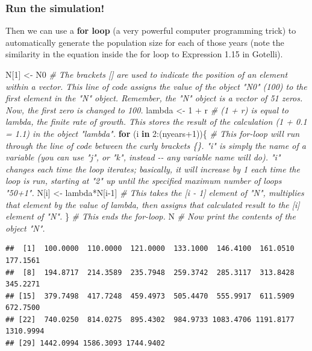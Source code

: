 \documentclass[
]{article}
\newenvironment{Shaded}{\begin{snugshade}}{\end{snugshade}}
\newcommand{\CommentTok}[1]{\textcolor[rgb]{0.56,0.35,0.01}{\textit{#1}}}
\newcommand{\ControlFlowTok}[1]{\textcolor[rgb]{0.13,0.29,0.53}{\textbf{#1}}}
\newcommand{\DecValTok}[1]{\textcolor[rgb]{0.00,0.00,0.81}{#1}}
\newcommand{\NormalTok}[1]{#1}
\newcommand{\OtherTok}[1]{\textcolor[rgb]{0.56,0.35,0.01}{#1}}
\newcommand{\SpecialCharTok}[1]{\textcolor[rgb]{0.00,0.00,0.00}{#1}}
\begin{document}
\hypertarget{run-the-simulation}{%
\subsubsection{Run the simulation!}\label{run-the-simulation}}

Then we can use a \textbf{for loop} (a very powerful computer
programming trick) to automatically generate the population size for
each of those years (note the similarity in the equation inside the for
loop to Expression 1.15 in Gotelli).

\begin{Shaded}
\begin{Highlighting}[]
\NormalTok{N[}\DecValTok{1}\NormalTok{] }\OtherTok{\textless{}{-}}\NormalTok{ N0                }\CommentTok{\# The brackets [] are used to indicate the position of an element within a vector. This line of code assigns the value of the object "N0" (100) to the first element in the "N" object. Remember, the "N" object is a vector of 51 zeros. Now, the first zero is changed to 100.}
\NormalTok{lambda }\OtherTok{\textless{}{-}} \DecValTok{1} \SpecialCharTok{+}\NormalTok{ r           }\CommentTok{\# (1 + r) is equal to lambda, the finite rate of growth.  This stores the result of the calculation (1 + 0.1 = 1.1) in the object "lambda".}
\ControlFlowTok{for}\NormalTok{ (i }\ControlFlowTok{in} \DecValTok{2}\SpecialCharTok{:}\NormalTok{(nyears}\SpecialCharTok{+}\DecValTok{1}\NormalTok{))\{  }\CommentTok{\# This for{-}loop will run through the line of code between the curly brackets \{\}. "i" is simply the name of a variable (you can use "j", or "k", instead {-}{-} any variable name will do). "i" changes each time the loop iterates; basically, it will increase by 1 each time the loop is run, starting at "2" up until the specified maximum number of loops "50+1". }
\NormalTok{  N[i] }\OtherTok{\textless{}{-}}\NormalTok{ lambda}\SpecialCharTok{*}\NormalTok{N[i}\DecValTok{{-}1}\NormalTok{]   }\CommentTok{\# This takes the [i {-} 1] element of "N", multiplies that element by the value of lambda, then assigns that calculated result to the [i] element of "N".}
\NormalTok{\}                         }\CommentTok{\# This ends the for{-}loop.}
\NormalTok{N                         }\CommentTok{\# Now print the contents of the object "N".}
\end{Highlighting}
\end{Shaded}

\begin{verbatim}
##  [1]  100.0000  110.0000  121.0000  133.1000  146.4100  161.0510  177.1561
##  [8]  194.8717  214.3589  235.7948  259.3742  285.3117  313.8428  345.2271
## [15]  379.7498  417.7248  459.4973  505.4470  555.9917  611.5909  672.7500
## [22]  740.0250  814.0275  895.4302  984.9733 1083.4706 1191.8177 1310.9994
## [29] 1442.0994 1586.3093 1744.9402
\end{verbatim}
\end{document}
